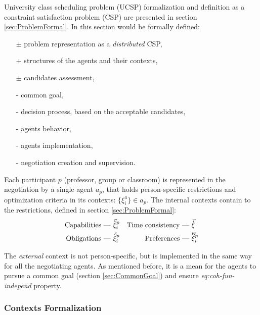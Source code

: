 University class scheduling problem (UCSP) formalization and definition as a
constraint satisfaction problem (CSP) are presented in section \ref{sec:ProblemFormal}.
In this section would be formally defined:
\begin{itemize}
  \item[$\pm$] problem representation as a \emph{distributed} CSP,
  \item[+] structures of the agents and their contexts,
  \item[$\pm$] candidates assessment,
  \item[-] common goal,
  \item[-] decision process, based on the acceptable candidates,
  \item[-] agents behavior,
  \item[-] agents implementation,
  \item[-] negotiation creation and supervision.
\end{itemize}



Each participant $p$ (professor, group or classroom) is represented in the negotiation
by a single agent $a_p$, that holds person-specific restrictions and optimization criteria
in its contexts: $ \{\xi^a_i\} \in a_p$. The internal contexts contain to
the restrictions, defined in section \ref{sec:ProblemFormal}:
\begin{align*}
   \text{Capabilities}      &\hbox{ --- } \accentset{C}{\xi}^p_i
&  \text{Time consistency}  &\hbox{ --- } \accentset{T}{\xi}
\\ \text{Obligations}       &\hbox{ --- } \accentset{S}{\xi}^p_i
&  \text{Preferences}       &\hbox{ --- } \accentset{W}{\xi}^p_i
\end{align*}

The \emph{external} context is not person-specific, but is implemented in the
same way for all the negotiating agents. As mentioned before, it is a mean for the
agents to pursue a common goal (section \ref{sec:CommonGoal}) and ensure
\emph{eq:coh-fun-independ} property.



\subsubsection{Contexts Formalization}

